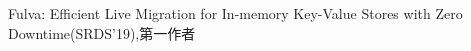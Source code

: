 \cventry
{} %
{Fulva: Efficient Live Migration for In-memory Key-Value Stores with Zero Downtime(SRDS'19),第一作者} %
{} %
{} %
{ %
}
